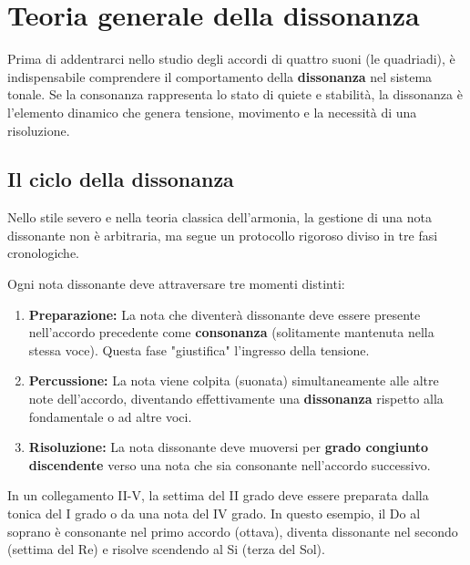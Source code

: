 \chapter{Teoria generale della dissonanza}
\label{chap:teoria_dissonanza}

Prima di addentrarci nello studio degli accordi di quattro suoni (le quadriadi), è indispensabile comprendere il comportamento della \textbf{dissonanza} nel sistema tonale. Se la consonanza rappresenta lo stato di quiete e stabilità, la dissonanza è l'elemento dinamico che genera tensione, movimento e la necessità di una risoluzione.

\section{Il ciclo della dissonanza}
\label{sec:ciclo_dissonanza}

Nello stile severo e nella teoria classica dell'armonia, la gestione di una nota dissonante non è arbitraria, ma segue un protocollo rigoroso diviso in tre fasi cronologiche.

\begin{regola}
        \label{reg:trattamento_dissonanza}
        Ogni nota dissonante deve attraversare tre momenti distinti:
        \begin{enumerate}
                \item \textbf{Preparazione:} La nota che diventerà dissonante deve essere presente nell'accordo precedente come \textbf{consonanza} (solitamente mantenuta nella stessa voce). Questa fase "giustifica" l'ingresso della tensione.
                \item \textbf{Percussione:} La nota viene colpita (suonata) simultaneamente alle altre note dell'accordo, diventando effettivamente una \textbf{dissonanza} rispetto alla fondamentale o ad altre voci.
                \item \textbf{Risoluzione:} La nota dissonante deve muoversi per \textbf{grado congiunto discendente} verso una nota che sia consonante nell'accordo successivo.
        \end{enumerate}
\end{regola}

\begin{esempio}
        \label{ex:ciclo_dissonanza}
        In un collegamento II-V, la settima del II grado deve essere preparata dalla tonica del I grado o da una nota del IV grado.
        In questo esempio, il Do al soprano è consonante nel primo accordo (ottava), diventa dissonante nel secondo (settima del Re) e risolve scendendo al Si (terza del Sol).
\end{esempio}


